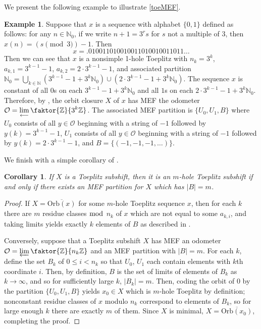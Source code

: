 \documentclass[11pt,reqno]{amsart}
\newtheorem{corollary}[theorem]{Corollary}
\theoremstyle{definition}
\newtheorem{example}[theorem]{Example}
\theoremstyle{plain}
\newcommand{\OO}{\mathrm{Orb}}
\newcommand{\Z}{\mathbb{Z}}
\newcommand{\N}{\mathbb{N}}
\begin{document}
We present the following example to illustrate \cref{toeMEF}. 
\begin{example}
   Suppose that $x$ is a sequence with alphabet $\{0,1\}$ defined as follows: for any $n \in \mathbb{N}_0$, if we write $n+1 = 3^r s$ for $s$ not a multiple of $3$, then 
    $x(n) = (s \pmod 3) -1$. Then
    \[
    x = .010011010010011010010011011\ldots
    \]
Then we can see that $x$ is a nonsimple 1-hole Toeplitz with $n_k = 3^k$, $a_{k,1} = 3^{k-1} - 1$, $a_{k,2} = 2 \cdot 3^{k-1} -  1$, and associated partition 
$\mathbb{N}_0 = \bigcup_{k \in \N} (3^{k-1} - 1 + 3^k \N_0) \cup (2 \cdot 3^{k-1} - 1 + 3^k \N_0)$. The sequence $x$ is constant of all $0$s on each $3^{k-1} - 1 + 3^k \N_0$ and all $1$s on each 
$2 \cdot 3^{k-1} - 1 + 3^k \N_0$. Therefore, by , the orbit closure $X$ of $x$ has MEF the odometer $\displaystyle \mathcal{O} = \lim_{\longleftarrow} \faktor{\Z}{3^k \Z}$. The associated MEF partition is $\{U_0, U_1, B\}$ where $U_0$ consists of all $y \in \mathcal{O}$ beginning with a string of $-1$ followed by $y(k) = 3^{k-1} - 1$, $U_1$ consists of all $y \in \mathcal{O}$ beginning with a string of $-1$ followed by $y(k) = 2 \cdot 3^{k-1} - 1$, and $B = \{(-1, -1, -1, \ldots)\}$.
\end{example}

We finish with a simple corollary of .

\begin{corollary}\label{mhole}
If $X$ is a Toeplitz subshift, then it is an $m$-hole Toeplitz subshift if and only if there exists an MEF partition for $X$ which has $|B| = m$.
\end{corollary}

\begin{proof}
    If $X = \overline{\OO(x)}$ for some $m$-hole Toeplitz sequence $x$, then for each $k$ there are $m$ residue classes $\bmod$  $n_k$ of $x$ which are not equal to some $a_{k,i}$, and taking limits yields exactly $k$ elements of $B$ as described in . 

    Conversely, suppose that a Toeplitz subshift $X$ has MEF an odometer 
    $\mathcal{O} = \varprojlim \faktor{\Z}{n_k\Z}$ and an MEF partition with $|B| = m$. For each $k$, define the set $B_k$ of $0 \leq i < n_k$ so that $U_0$, $U_1$ each contain elements with $k$th coordinate $i$. Then, by definition, $B$ is the set of limits of elements of $B_k$ as $k \rightarrow \infty$, and so for sufficiently large $k$, $|B_k| = m$. Then, coding the orbit of $0$ by the partition $\{U_0, U_1, B\}$ yields $x_0 \in X$ which is $m$-hole Toeplitz by definition; nonconstant residue classes of $x$ modulo $n_k$ correspond to elements of $B_k$, so for large enough $k$ there are exactly $m$ of them. Since $X$ is minimal, $X = \overline{\OO(x_0)}$, completing the proof.
\end{proof}
\end{document}

